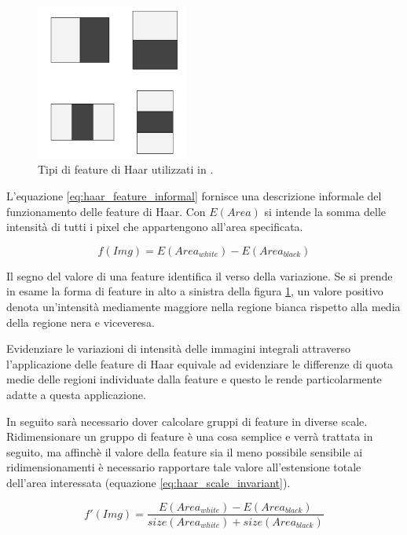\begin{figure}
    \centering
    \includegraphics[width=5cm]{img/feature_types.jpg}
    \caption{Tipi di feature di Haar utilizzati in \cite{Zhu13}.}
    \label{fig:features_type}
\end{figure}

L'equazione \ref{eq:haar_feature_informal} fornisce una descrizione informale del funzionamento delle feature di Haar. Con $E(Area)$ si intende la somma delle intensità di tutti i pixel che appartengono all'area specificata.

\begin{equation}
    f(Img) = E(Area_{white}) - E(Area_{black})
    \label{eq:haar_feature_informal}
\end{equation}

Il segno del valore di una feature identifica il verso della variazione. Se si prende in esame la forma di feature in alto a sinistra della figura \ref{fig:features_type}, un valore positivo denota un'intensità mediamente maggiore nella regione bianca rispetto alla media della regione nera e viceveresa.

Evidenziare le variazioni di intensità delle immagini integrali attraverso l'applicazione delle feature di Haar equivale ad evidenziare le differenze di quota medie delle regioni individuate dalla feature e questo le rende particolarmente adatte a questa applicazione.

In seguito sarà necessario dover calcolare gruppi di feature in diverse scale. Ridimensionare un gruppo di feature è una cosa semplice e verrà trattata in seguito, ma affinchè il valore della feature sia il meno possibile sensibile ai ridimensionamenti è necessario rapportare tale valore all'estensione totale dell'area interessata (equazione \ref{eq:haar_scale_invariant}).

\begin{equation}
    f'(Img) = \frac{E(Area_{white}) - E(Area_{black})}{size(Area_{white}) + size(Area_{black})}
    \label{eq:haar_scale_invariant}
\end{equation}

